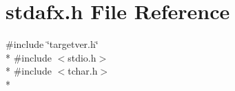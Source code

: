 \section{stdafx.\+h File Reference}
\label{stdafx_8h}
{\ttfamily \#include \char`\"{}targetver.\+h\char`\"{}}\\*
{\ttfamily \#include $<$stdio.\+h$>$}\\*
{\ttfamily \#include $<$tchar.\+h$>$}\\*
